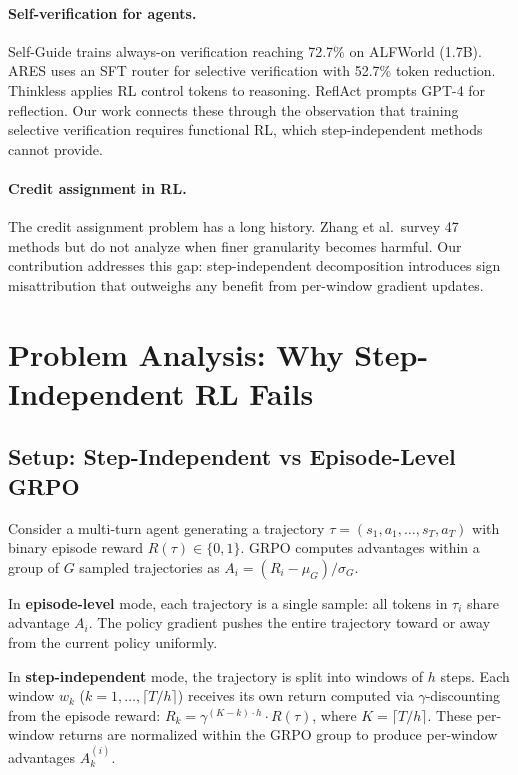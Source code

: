 \documentclass[11pt]{article}
\begin{document}
\paragraph{Self-verification for agents.}
Self-Guide trains always-on verification reaching 72.7\% on ALFWorld (1.7B). ARES uses an SFT router for selective verification with 52.7\% token reduction. Thinkless applies RL control tokens to reasoning. ReflAct prompts GPT-4 for reflection. Our work connects these through the observation that training selective verification requires functional RL, which step-independent methods cannot provide.

\paragraph{Credit assignment in RL.}
The credit assignment problem has a long history. Zhang et al.\ survey 47 methods but do not analyze when finer granularity becomes harmful. Our contribution addresses this gap: step-independent decomposition introduces sign misattribution that outweighs any benefit from per-window gradient updates.

\section{Problem Analysis: Why Step-Independent RL Fails}
\label{sec:mechanism}

\subsection{Setup: Step-Independent vs Episode-Level GRPO}

Consider a multi-turn agent generating a trajectory $\tau = (s_1, a_1, \ldots, s_T, a_T)$ with binary episode reward $R(\tau) \in \{0, 1\}$. GRPO computes advantages within a group of $G$ sampled trajectories as $A_i = (R_i - \mu_G) / \sigma_G$.

In \textbf{episode-level} mode, each trajectory is a single sample: all tokens in $\tau_i$ share advantage $A_i$. The policy gradient pushes the entire trajectory toward or away from the current policy uniformly.

In \textbf{step-independent} mode, the trajectory is split into windows of $h$ steps. Each window $w_k$ ($k = 1, \ldots, \lceil T/h \rceil$) receives its own return computed via $\gamma$-discounting from the episode reward: $R_k = \gamma^{(K-k) \cdot h} \cdot R(\tau)$, where $K = \lceil T/h \rceil$. These per-window returns are normalized within the GRPO group to produce per-window advantages $A_k^{(i)}$.
\end{document}
